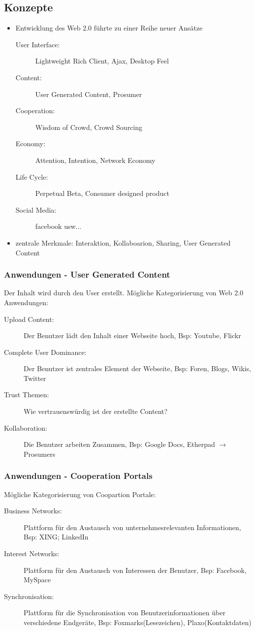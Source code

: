 \documentclass{article} %
\begin{document}
	\subsection{Konzepte}
	\begin{itemize}
		\item Entwicklung des Web 2.0 führte zu einer Reihe neuer Ansätze
		\begin{description}
			\item[User Interface:] Lightweight Rich Client, Ajax, Desktop Feel
			\item[Content:] User Generated Content, Prosumer
			\item[Cooperation:] Wisdom of Crowd, Crowd Sourcing
			\item[Economy:] Attention, Intention, Network Economy
			\item[Life Cycle:] Perpetual Beta, Consumer designed product
			\item[Social Media:] facebook usw...
		\end{description}
		\item zentrale Merkmale: Interaktion, Kollaboarion, Sharing, User Generated Content
	\end{itemize}
	\subsubsection{Anwendungen - User Generated Content}
	Der Inhalt wird durch den User erstellt. Mögliche Kategorisierung von Web 2.0 Anwendungen:
		\begin{description}
			\item [Upload Content:] Der Benutzer lädt den Inhalt einer Webseite hoch, Bsp: Youtube, Flickr
			\item [Complete User Dominance:] Der Benutzer ist zentrales Element der Webseite, Bsp: Foren, Blogs, Wikis, Twitter
			\item [Trust Themen:] Wie vertrauenswürdig ist der erstellte Content? 
			\item [Kollaboration:] Die Benutzer arbeiten Zusammen, Bsp: Google Docs, Etherpad $\rightarrow$ Prosumers
		\end{description}
	\subsubsection{Anwendungen - Cooperation Portals}
	 Mögliche Kategorisierung von Coopartion Portale:
		\begin{description}
			\item[Business Networks:] Plattform für den Austausch von unternehmesrelevanten Informationen, Bsp: XING; LinkedIn
			\item[Interest Networks:] Plattform für den Austausch von Interessen der Benutzer, Bsp: Facebook, MySpace
			\item[Synchronisation:] Plattform für die Synchronisation von Benutzerinformationen über verschiedene Endgeräte, Bsp: Foxmarks(Lesezeichen), Plaxo(Kontaktdaten)
		\end{description}
\end{document}
